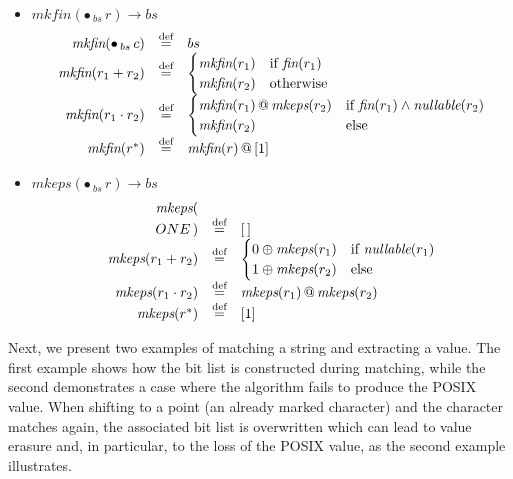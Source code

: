 \documentclass[12pt]{article}
\makeatletter
\newcommand{\ONE}{\textbf{1}}
\newcommand{\mkeps}{\textit{mkeps}}
\newcommand{\Marked}[1]{\bullet\,#1}
\newcommand{\fin}{\textit{fin}}
\newcommand{\nullable}{\textit{nullable}}
\newcommand{\mkfin}{\textit{mkfin}}
\newcommand{\emptylist}{[\,]}
\newcommand{\At}{$\,@\,$}
\makeatother
\begin{document}
\begin{itemize}
\item $\mkfin(\Marked{_{bs}\,r}) \to bs$
\[
\begin{array}{rcl}
\mkfin(\Marked{_{bs}\,c}) & \stackrel{\text{def}}{=} & bs \\
\mkfin(r_1 + r_2)         & \stackrel{\text{def}}{=} & 
  \begin{cases}
    \mkfin(r_1) & \text{if } \fin(r_1) \\
    \mkfin(r_2) & \text{otherwise}
  \end{cases} \\
\mkfin(r_1 \cdot r_2)     & \stackrel{\text{def}}{=} & 
  \begin{cases}
    \mkfin(r_1) \At \mkeps(r_2) & \text{if } \fin(r_1) \land \nullable(r_2) \\
    \mkfin(r_2)                 & \text{else}
  \end{cases} \\
\mkfin(r^*)               & \stackrel{\text{def}}{=} & \mkfin(r) \At [1]
\end{array}
\]
\item $\mkeps(\Marked{_{bs}\,r}) \to bs$
\[
\begin{array}{rcl}
\mkeps(\\ONE\,) & \stackrel{\text{def}}{=} & \emptylist \\
\mkeps(r_1 + r_2)           & \stackrel{\text{def}}{=} & 
  \begin{cases}
    0 \oplus \mkeps(r_1) & \text{if } \nullable(r_1) \\
    1 \oplus \mkeps(r_2) & \text{else}
  \end{cases} \\[2ex]
\mkeps(r_1 \cdot r_2)       & \stackrel{\text{def}}{=} & \mkeps(r_1) \At \mkeps(r_2) \\
\mkeps(r^*)                 & \stackrel{\text{def}}{=} & [1]
\end{array}
\]
\end{itemize}

Next, we present two examples of matching a string and extracting a value.  
The first example shows how the bit list is constructed during matching,  
while the second demonstrates a case where the algorithm fails to produce the POSIX value.
When shifting to a point (an already marked character) and the character matches again, the associated 
bit list is overwritten which can lead to value erasure and, in particular, to the loss of the POSIX value,  
as the second example illustrates.  
\end{document}
